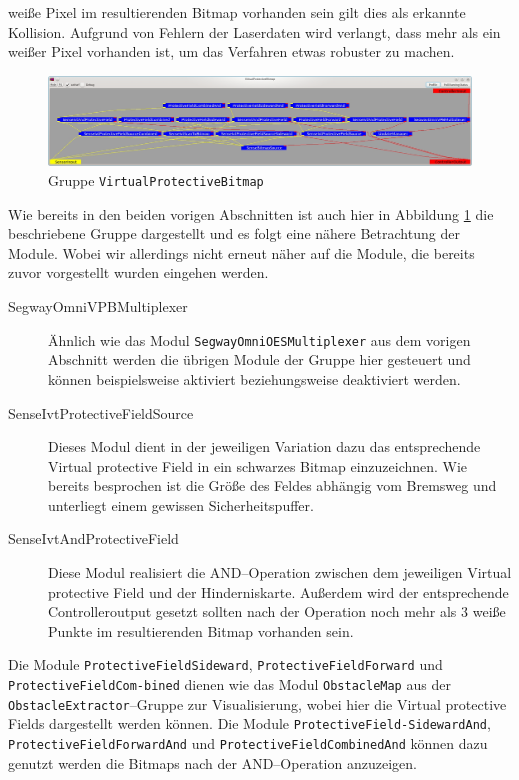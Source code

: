  weiße Pixel im resultierenden Bitmap vorhanden sein gilt dies als erkannte Kollision. Aufgrund von Fehlern der Laserdaten wird verlangt, dass mehr als ein
 weißer Pixel vorhanden ist, um das Verfahren etwas robuster zu machen.
\begin{figure}[h]
\center
\includegraphics[scale=0.29]{graphics/VirtualProtectiveBitmap.jpg}
\caption{\label{fig:virtualprotectivebitmap} Gruppe \lstinline{VirtualProtectiveBitmap}}
\end{figure}
 Wie bereits in den beiden vorigen Abschnitten  ist auch hier in Abbildung
 \ref{fig:virtualprotectivebitmap} die beschriebene Gruppe dargestellt und es
 folgt eine nähere Betrachtung der Module.
 Wobei wir allerdings nicht erneut näher auf die Module, die bereits zuvor
 vorgestellt wurden eingehen werden.

\begin{description}
\item[SegwayOmniVPBMultiplexer] Ähnlich wie das Modul
\lstinline{SegwayOmniOESMultiplexer} aus dem vorigen Abschnitt werden die
 übrigen Module der Gruppe hier gesteuert und können beispielsweise aktiviert
 beziehungsweise deaktiviert werden.
\item[SenseIvtProtectiveFieldSource] Dieses Modul dient in der jeweiligen
Variation dazu das entsprechende Virtual protective Field in ein schwarzes
Bitmap einzuzeichnen. Wie bereits besprochen ist die Größe des Feldes abhängig
vom Bremsweg und unterliegt einem gewissen Sicherheitspuffer.
\item[SenseIvtAndProtectiveField]  Diese Modul realisiert die AND--Operation zwischen dem jeweiligen
 Virtual protective Field und der Hinderniskarte. Außerdem wird der entsprechende Controlleroutput gesetzt
 sollten nach der Operation noch mehr als 3 weiße Punkte im resultierenden Bitmap vorhanden sein.
\end{description}

Die Module \lstinline{ProtectiveFieldSideward},
 \lstinline{ProtectiveFieldForward} und
 \lstinline{ProtectiveFieldCom-}\lstinline{bined} dienen wie das Modul
 \lstinline{ObstacleMap} aus der \lstinline{ObstacleExtractor}--Gruppe zur Visualisierung, wobei hier die Virtual
 protective Fields dargestellt werden können. Die Module 
 \lstinline{ProtectiveField-}\lstinline{SidewardAnd},
 \lstinline{ProtectiveFieldForwardAnd} und \lstinline{ProtectiveFieldCombinedAnd} können dazu genutzt werden die
 Bitmaps nach der AND--Operation anzuzeigen.
